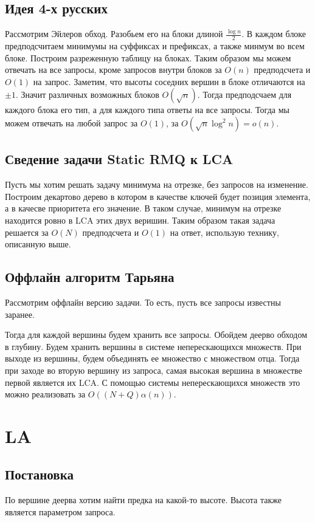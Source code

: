 \documentclass[12pt,a4paper]{article}
\theoremstyle{plain}
\begin{document}
\subsection{Идея 4-х русских}

Рассмотрим Эйлеров обход. Разобьем его на блоки длиной $\frac{\log{n}}{2}$.
В каждом блоке предподсчитаем минимумы на суффиксах и префиксах,
а также минмум во всем блоке.
Построим разреженную таблицу на блоках.
Таким образом мы можем отвечать на все запросы, кроме запросов внутри блоков
за $O(n)$ предподсчета и $O(1)$ на запрос.
Заметим, что высоты соседних вершин в блоке отличаются на $\pm 1$. Значит различных возможных блоков
$O(\sqrt{n})$. Тогда предподсчаем для каждого блока его тип, а для каждого типа ответы на все запросы.
Тогда мы можем отвечать на любой запрос за $O(1)$, за $O(\sqrt{n}\log^2{n}) = o(n)$.

\subsection{Сведение задачи Static RMQ к LCA}

Пусть мы хотим решать задачу минимума на отрезке, без запросов на изменение.
Построим декартово дерево в котором в качестве ключей будет позиция элемента,
а в качесве приоритета его значение. В таком случае, минимум на отрезке находится ровно в LCA этих двух веришин.
Таким образом такая задача решается за $O(N)$ предподсчета и $O(1)$ на ответ, использую технику, описанную выше.

\subsection{Оффлайн алгоритм Тарьяна}

Рассмотрим оффлайн версию задачи. То есть, пусть все запросы известны заранее.

Тогда для каждой вершины будем хранить все запросы.
Обойдем деерво обходом в глубину. Будем хранить вершины в системе неперескающихся
множеств. При выходе из вершины, будем объединять ее множество с множеством отца.
Тогда при заходе во вторую вершину из запроса, самая высокая вершина в множестве первой
является их LCA. С помощью системы неперескающихся множеств это можно реализовать за
$O((N+Q)\alpha{(n)})$.

\section{LA}
\subsection{Постановка}
По вершине деерва хотим найти предка на какой-то высоте. Высота также является параметром запроса.
\end{document}
